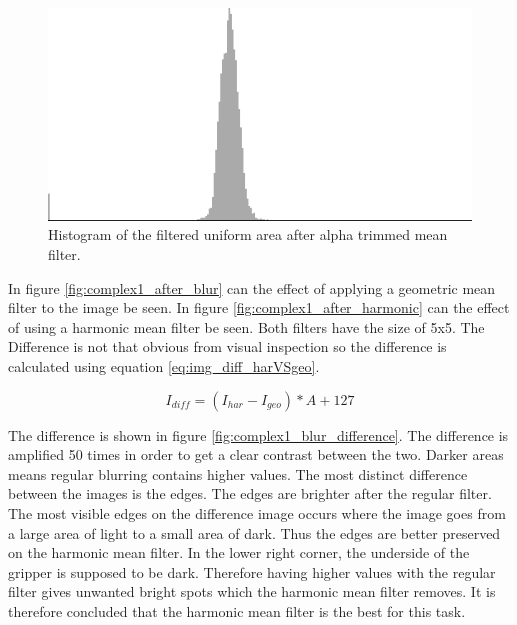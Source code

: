 \begin{figure}[H]
\centering
\includegraphics[width = \histogramWidth]{graphics/hist1_uniform2.png}
\caption{Histogram of the filtered uniform area after alpha trimmed mean filter.}
\label{fig:hist_img1_after_alpha}
\end{figure}

In figure \ref{fig:complex1_after_blur} can the effect of applying a geometric mean filter to the image be seen.
In figure \ref{fig:complex1_after_harmonic} can the effect of using a harmonic mean filter be seen.
Both filters have the size of 5x5. 
The Difference is not that obvious from visual inspection so the difference is calculated using equation \ref{eq:img_diff_harVSgeo}.

\begin{equation}
I_{diff} = \left( I_{har} - I_{geo} \right) * A + 127
\label{eq:img_diff_harVSgeo}
\end{equation}

The difference is shown in figure \ref{fig:complex1_blur_difference}.
The difference is amplified 50 times in order to get a clear contrast between the two.
Darker areas means regular blurring contains higher values.
The most distinct difference between the images is the edges. 
The edges are brighter after the regular filter. 
The most visible edges on the difference image occurs where the image goes from a large area of light to a small area of dark.
Thus the edges are better preserved on the harmonic mean filter.
In the lower right corner, the underside of the gripper is supposed to be dark.
Therefore having higher values with the regular filter gives unwanted bright spots which the harmonic mean filter removes.
It is therefore concluded that the harmonic mean filter is the best for this task.

